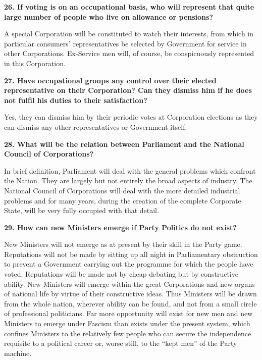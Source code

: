 \documentclass{book}
\begin{document}
\begin{flushleft}
\textbf{26. If voting is on an occupational basis, who will represent that quite large number of people who live on allowance or pensions?}

A special Corporation will be constituted to watch their interests, from which in particular
consumers' representatives be selected by Government for service in other Corporations. Ex-Service men will, of course, be conspicuously represented in this Corporation.
\end{flushleft}

\begin{flushright}
\textbf{27. Have occupational groups any control over their elected representative on their Corporation? Can they dismiss him if he does not fulfil his duties to their satisfaction?}

Yes, they can dismiss him by their periodic votes at Corporation elections as they can dismiss any other representatives or Government itself.
\end{flushright}

\begin{flushleft}
\textbf{28. What will be the relation between Parliament and the National Council of Corporations?}

In brief definition, Parliament will deal with the general problems which confront the Nation.
They are largely but not entirely the broad aspects of industry. The National Council of
Corporations will deal with the more detailed industrial problems and for many years, during the creation of the complete Corporate State, will be very fully occupied with that detail.
\end{flushleft}

\begin{flushright}
    \textbf{29. How can new Ministers emerge if Party Politics do not exist?}

New Ministers will not emerge as at present by their skill in the Party game. Reputations will not
be made by sitting up all night in Parliamentary obstruction to prevent a Government carrying
out the programme for which the people have voted. Reputations will be made not by cheap
debating but by constructive ability. New Ministers will emerge within the great Corporations
and new organs of national life by virtue of their constructive ideas. Thus Ministers will be
drawn from the whole nation, wherever ability can be found, and not from a small circle of
professional politicians. Far more opportunity will exist for new men and new Ministers to
emerge under Fascism than exists under the present system, which confines Ministers to the
relatively few people who can secure the independence requisite to a political career or, worse still, to the ``kept men'' of the Party machine.
\end{flushright}
\end{document}
